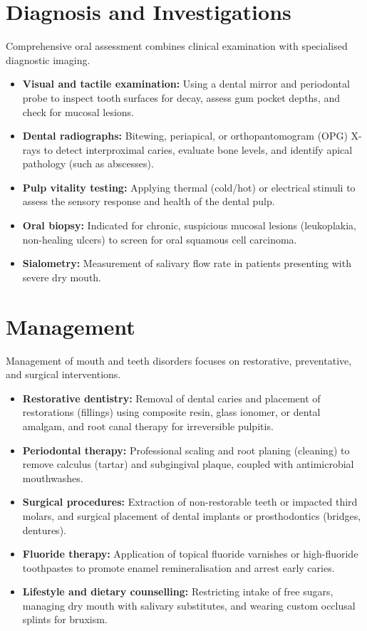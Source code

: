 \section*{Diagnosis and Investigations}
Comprehensive oral assessment combines clinical examination with specialised diagnostic imaging.
\begin{itemize}
    \item \textbf{Visual and tactile examination:} Using a dental mirror and periodontal probe to inspect tooth surfaces for decay, assess gum pocket depths, and check for mucosal lesions.
    \item \textbf{Dental radiographs:} Bitewing, periapical, or orthopantomogram (OPG) X-rays to detect interproximal caries, evaluate bone levels, and identify apical pathology (such as abscesses).
    \item \textbf{Pulp vitality testing:} Applying thermal (cold/hot) or electrical stimuli to assess the sensory response and health of the dental pulp.
    \item \textbf{Oral biopsy:} Indicated for chronic, suspicious mucosal lesions (leukoplakia, non-healing ulcers) to screen for oral squamous cell carcinoma.
    \item \textbf{Sialometry:} Measurement of salivary flow rate in patients presenting with severe dry mouth.
\end{itemize}

\section*{Management}
Management of mouth and teeth disorders focuses on restorative, preventative, and surgical interventions.
\begin{itemize}
    \item \textbf{Restorative dentistry:} Removal of dental caries and placement of restorations (fillings) using composite resin, glass ionomer, or dental amalgam, and root canal therapy for irreversible pulpitis.
    \item \textbf{Periodontal therapy:} Professional scaling and root planing (cleaning) to remove calculus (tartar) and subgingival plaque, coupled with antimicrobial mouthwashes.
    \item \textbf{Surgical procedures:} Extraction of non-restorable teeth or impacted third molars, and surgical placement of dental implants or prosthodontics (bridges, dentures).
    \item \textbf{Fluoride therapy:} Application of topical fluoride varnishes or high-fluoride toothpastes to promote enamel remineralisation and arrest early caries.
    \item \textbf{Lifestyle and dietary counselling:} Restricting intake of free sugars, managing dry mouth with salivary substitutes, and wearing custom occlusal splints for bruxism.
\end{itemize}

